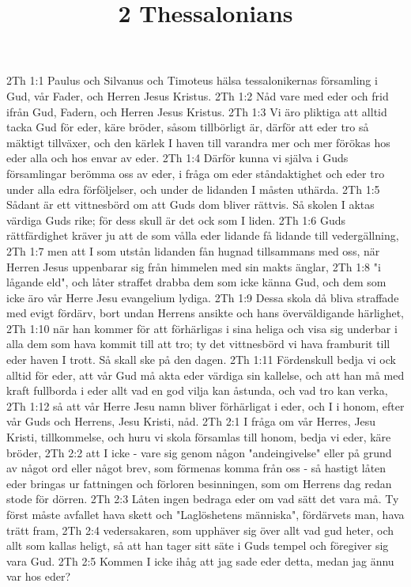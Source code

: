 

\title{2 Thessalonians}

2Th 1:1  Paulus och Silvanus och Timoteus hälsa tessalonikernas församling i Gud, vår Fader, och Herren Jesus Kristus.
2Th 1:2  Nåd vare med eder och frid ifrån Gud, Fadern, och Herren Jesus Kristus.
2Th 1:3  Vi äro pliktiga att alltid tacka Gud för eder, käre bröder, såsom tillbörligt är, därför att eder tro så mäktigt tillväxer, och den kärlek I haven till varandra mer och mer förökas hos eder alla och hos envar av eder.
2Th 1:4  Därför kunna vi själva i Guds församlingar berömma oss av eder, i fråga om eder ståndaktighet och eder tro under alla edra förföljelser, och under de lidanden I måsten uthärda.
2Th 1:5  Sådant är ett vittnesbörd om att Guds dom bliver rättvis. Så skolen I aktas värdiga Guds rike; för dess skull är det ock som I liden.
2Th 1:6  Guds rättfärdighet kräver ju att de som vålla eder lidande få lidande till vedergällning,
2Th 1:7  men att I som utstån lidanden fån hugnad tillsammans med oss, när Herren Jesus uppenbarar sig från himmelen med sin makts änglar,
2Th 1:8  "i lågande eld", och låter straffet drabba dem som icke känna Gud, och dem som icke äro vår Herre Jesu evangelium lydiga.
2Th 1:9  Dessa skola då bliva straffade med evigt fördärv, bort undan Herrens ansikte och hans överväldigande härlighet,
2Th 1:10  när han kommer för att förhärligas i sina heliga och visa sig underbar i alla dem som hava kommit till att tro; ty det vittnesbörd vi hava framburit till eder haven I trott. Så skall ske på den dagen.
2Th 1:11  Fördenskull bedja vi ock alltid för eder, att vår Gud må akta eder värdiga sin kallelse, och att han må med kraft fullborda i eder allt vad en god vilja kan åstunda, och vad tro kan verka,
2Th 1:12  så att vår Herre Jesu namn bliver förhärligat i eder, och I i honom, efter vår Guds och Herrens, Jesu Kristi, nåd.
2Th 2:1  I fråga om vår Herres, Jesu Kristi, tillkommelse, och huru vi skola församlas till honom, bedja vi eder, käre bröder,
2Th 2:2  att I icke - vare sig genom någon "andeingivelse" eller på grund av något ord eller något brev, som förmenas komma från oss - så hastigt låten eder bringas ur fattningen och förloren besinningen, som om Herrens dag redan stode för dörren.
2Th 2:3  Låten ingen bedraga eder om vad sätt det vara må. Ty först måste avfallet hava skett och "Laglöshetens människa", fördärvets man, hava trätt fram,
2Th 2:4  vedersakaren, som upphäver sig över allt vad gud heter, och allt som kallas heligt, så att han tager sitt säte i Guds tempel och föregiver sig vara Gud.
2Th 2:5  Kommen I icke ihåg att jag sade eder detta, medan jag ännu var hos eder?
